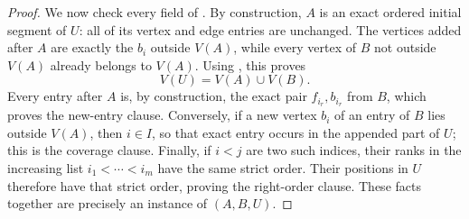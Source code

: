 \begin{proof}
We now check every field of .  By construction,
$A$ is an exact ordered initial segment of $U$: all of its vertex and edge
entries are unchanged.  The vertices added after $A$ are exactly the
$b_i$ outside $V(A)$, while every vertex of $B$ not outside $V(A)$ already
belongs to $V(A)$.  Using , this proves
\[
                         V(U)=V(A)\cup V(B).                     \tag{3}
\]
Every entry after $A$ is, by construction, the exact pair
$f_{i_r},b_{i_r}$ from $B$, which proves the new-entry clause.  Conversely,
if a new vertex $b_i$ of an entry of $B$ lies outside $V(A)$, then
$i\in I$, so that exact entry occurs in the appended part of $U$; this is
the coverage clause.  Finally, if $i<j$ are two such indices, their ranks
in the increasing list $i_1<\cdots<i_m$ have the same strict order.
Their positions in $U$ therefore have that strict order, proving the
right-order clause.  These facts together are precisely an instance of
$(A,B,U)$.
\end{proof}
